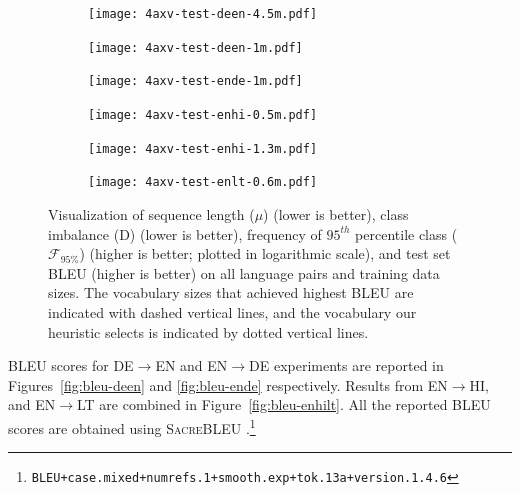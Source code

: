 \begin{figure}[!ht]
\begin{subfigure}{\textwidth}
  \centering
  \texttt{[image: 4axv-test-deen-4.5m.pdf]}
\end{subfigure}

\begin{subfigure}{0.48\linewidth}
  \centering
  \texttt{[image: 4axv-test-deen-1m.pdf]}
\end{subfigure}
\begin{subfigure}{0.48\linewidth}
  \centering
  \texttt{[image: 4axv-test-ende-1m.pdf]}
\end{subfigure}

\begin{subfigure}{.48\textwidth}
  \centering
  \texttt{[image: 4axv-test-enhi-0.5m.pdf]}
\end{subfigure}
\begin{subfigure}{.48\textwidth}
  \centering
  \texttt{[image: 4axv-test-enhi-1.3m.pdf]}
\end{subfigure}


\begin{subfigure}{.55\textwidth}
  \centering
  \texttt{[image: 4axv-test-enlt-0.6m.pdf]}
\end{subfigure}


\caption{Visualization of sequence length ($\mu$) (lower is better), class imbalance (D) (lower is better), frequency of $95^{th}$ percentile class ($\mathcal{F}_{95\%}$) (higher is better; plotted in logarithmic scale), and test set BLEU (higher is better) on all language pairs and training data sizes. %
The vocabulary sizes that achieved highest BLEU are indicated with dashed vertical lines, and the vocabulary our heuristic selects is indicated by dotted vertical lines.}
\label{fig:mu-d-freq-bleu-part2}
\end{figure}


BLEU scores for DE$\rightarrow$EN and EN$\rightarrow$DE experiments are reported in Figures~\ref{fig:bleu-deen} and \ref{fig:bleu-ende} respectively.
Results from EN$\rightarrow$HI, and EN$\rightarrow$LT are combined in Figure~\ref{fig:bleu-enhilt}. %
All the reported BLEU scores are obtained using \textsc{SacreBLEU} \cite{post-2018-sacreBLEU}.\footnote{\texttt{BLEU+case.mixed+numrefs.1+smooth.exp+tok.13a+version.1.4.6}}

